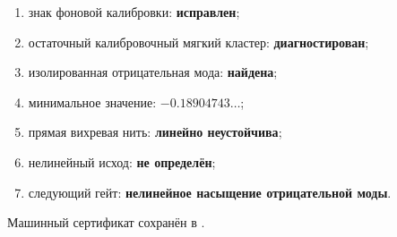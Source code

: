 \begin{protocol}
\begin{enumerate}
 \item знак фоновой калибровки: \textbf{исправлен};
 \item остаточный калибровочный мягкий кластер: \textbf{диагностирован};
 \item изолированная отрицательная мода: \textbf{найдена};
 \item минимальное значение: \textbf{$-0.18904743\ldots$};
 \item прямая вихревая нить: \textbf{линейно неустойчива};
 \item нелинейный исход: \textbf{не определён};
 \item следующий гейт: \textbf{нелинейное насыщение отрицательной моды}.
\end{enumerate}
\end{protocol}

Машинный сертификат сохранён в
.